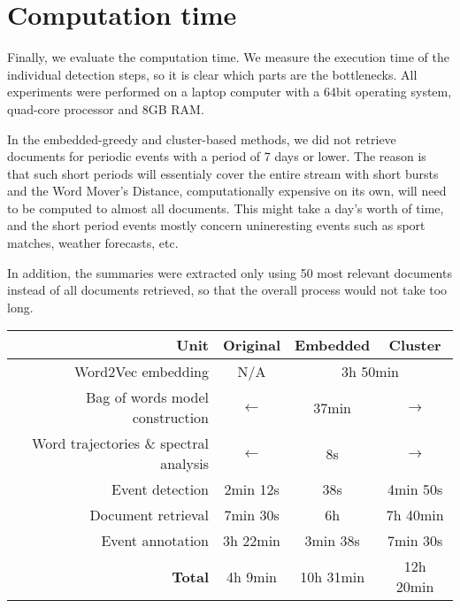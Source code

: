 \section{Computation time}

Finally, we evaluate the computation time. We measure the execution time of the individual detection steps, so it is clear which parts are the bottlenecks. All experiments were performed on a laptop computer with a 64bit operating system, quad-core processor and 8GB RAM.

In the embedded-greedy and cluster-based methods, we did not retrieve documents for periodic events with a period of 7 days or lower. The reason is that such short periods will essentialy cover the entire stream with short bursts and the Word Mover's Distance, computationally expensive on its own, will need to be computed to almost all documents. This might take a day's worth of time, and the short period events mostly concern unineresting events such as sport matches, weather forecasts, etc.

In addition, the summaries were extracted only using 50 most relevant documents instead of all documents retrieved, so that the overall process would not take too long.

\hspace{\fill}

\begin{minipage}{\linewidth}
\centering
\begin{tabular}{ r c c c }\toprule[1.5pt]
\bf Unit & \bf Original & \bf Embedded & \bf Cluster \\ \midrule
Word2Vec embedding & N/A & \multicolumn{2}{c}{3h 50min} \\
Bag of words model construction & $\longleftarrow$ & 37min & $\longrightarrow$ \\
Word trajectories \& spectral analysis & $\longleftarrow$ & 8s & $\longrightarrow$ \\
Event detection & 2min 12s & 38s & 4min 50s \\
Document retrieval & 7min 30s & 6h & 7h 40min \\
Event annotation & 3h 22min & 3min 38s & 7min 30s \\ \midrule
\bf Total & 4h 9min & 10h 31min & 12h 20min\\ \bottomrule[1.25pt]

\end{tabular}\par
{} \label{tab:title}
\end{minipage}

